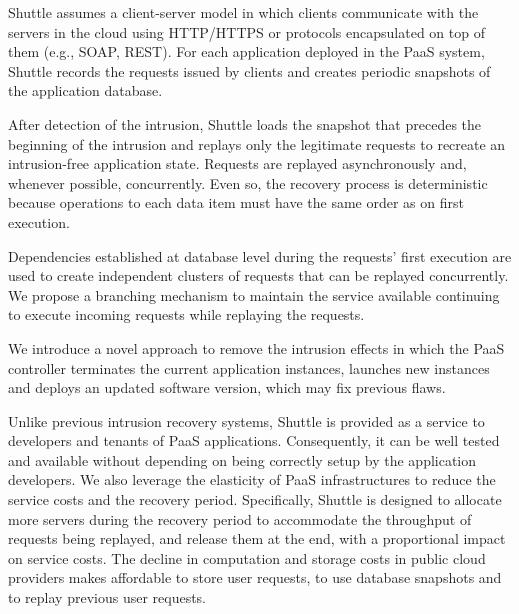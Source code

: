 Shuttle assumes a client-server model in which clients communicate with the servers in the cloud using \ac{HTTP}/\ac{HTTPS} or protocols encapsulated on top of them (e.g., \acs{SOAP}, \acs{REST}). For each application deployed in the \ac{PaaS} system, Shuttle records the requests issued by clients and creates periodic snapshots of the application database. 

After detection of the intrusion, Shuttle loads the snapshot that precedes the beginning of the intrusion and replays only the legitimate requests to recreate an intrusion-free application state. Requests are replayed asynchronously and, whenever possible, concurrently. Even so, the recovery process is deterministic because operations to each data item must have the same order as on first execution. 

Dependencies established at database level during the requests' first execution are used to create independent clusters of requests that can be replayed concurrently. We propose a branching mechanism to maintain the service available continuing to execute incoming requests while replaying the requests. 

We introduce a novel approach to remove the intrusion effects in which the \ac{PaaS} controller terminates the current application instances, launches new instances and deploys an updated software version, which may fix previous flaws.



Unlike previous intrusion recovery systems, Shuttle is provided as a service to developers and tenants of \ac{PaaS} applications. Consequently, it can be well tested and available without depending on being correctly setup by the application developers. We also leverage the elasticity of \ac{PaaS} infrastructures to reduce the service costs and the recovery period. Specifically, Shuttle is designed to allocate more servers during the recovery period to accommodate the throughput of requests being replayed, and release them at the end, with a proportional impact on service costs. The decline in computation and storage costs in public cloud providers makes affordable to store user requests, to use database snapshots and to replay previous user requests.

